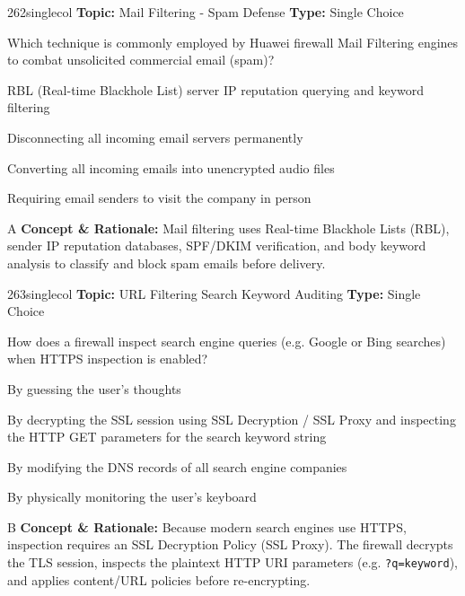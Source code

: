 \begin{qcard}{262}{singlecol}
\textcolor{darkslate!75}{\small\textbf{Topic:} Mail Filtering - Spam Defense \hfill \textbf{Type:} Single Choice}\vspace{0.4em}\par
Which technique is commonly employed by Huawei firewall Mail Filtering engines to combat unsolicited commercial email (spam)?
\begin{qoptions}
\item RBL (Real-time Blackhole List) server IP reputation querying and keyword filtering
\item Disconnecting all incoming email servers permanently
\item Converting all incoming emails into unencrypted audio files
\item Requiring email senders to visit the company in person
\end{qoptions}
\end{qcard}
\nopagebreak
\begin{explainbox}{A}
\textbf{Concept \& Rationale:} Mail filtering uses Real-time Blackhole Lists (RBL), sender IP reputation databases, SPF/DKIM verification, and body keyword analysis to classify and block spam emails before delivery.
\end{explainbox}

\begin{qcard}{263}{singlecol}
\textcolor{darkslate!75}{\small\textbf{Topic:} URL Filtering Search Keyword Auditing \hfill \textbf{Type:} Single Choice}\vspace{0.4em}\par
How does a firewall inspect search engine queries (e.g. Google or Bing searches) when HTTPS inspection is enabled?
\begin{qoptions}
\item By guessing the user's thoughts
\item By decrypting the SSL session using SSL Decryption / SSL Proxy and inspecting the HTTP GET parameters for the search keyword string
\item By modifying the DNS records of all search engine companies
\item By physically monitoring the user's keyboard
\end{qoptions}
\end{qcard}
\nopagebreak
\begin{explainbox}{B}
\textbf{Concept \& Rationale:} Because modern search engines use HTTPS, inspection requires an SSL Decryption Policy (SSL Proxy). The firewall decrypts the TLS session, inspects the plaintext HTTP URI parameters (e.g. \texttt{?q=keyword}), and applies content/URL policies before re-encrypting.
\end{explainbox}

